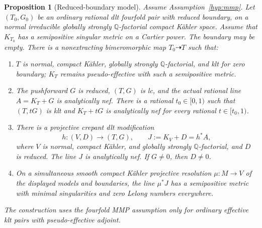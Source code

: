 \documentclass[11pt,letterpaper]{article}
\newtheorem{proposition}[theorem]{Proposition}
\theoremstyle{definition}
\theoremstyle{remark}
\begin{document}
\begin{proposition}[Reduced-boundary model]
\label{bir:reduced-model}
Assume Assumption~\ref{hyp:mmp}.  Let $(T_0,G_0)$ be an ordinary
rational dlt fourfold pair with reduced boundary, on a normal
irreducible globally strongly $\mathbb{Q}$-factorial compact K\"ahler space.
Assume that $K_{T_0}$ has a semipositive singular metric on a Cartier
power.  The boundary may be empty.  There is a nonextracting
bimeromorphic map $T_0\dashrightarrow T$ such that:
\begin{enumerate}[label=\textup{(\roman*)}]
\item $T$ is normal, compact K\"ahler, globally strongly
$\mathbb{Q}$-factorial, and klt for zero boundary; $K_T$ remains
pseudo-effective with such a semipositive metric.
\item The pushforward $G$ is reduced, $(T,G)$ is lc, and the
actual rational line $A=K_T+G$ is analytically nef.  There is a
rational $t_0\in[0,1)$ such that $(T,tG)$ is klt and
$K_T+tG$ is analytically nef for every rational
$t\in[t_0,1)$.
\item There is a projective crepant dlt modification
\begin{equation}
 h:(V,D)\longrightarrow(T,G),\qquad
 J:=K_V+D=h^*A,
 \label{bir:reduced-adjoint}
\end{equation}
where $V$ is normal, compact K\"ahler, and globally strongly
$\mathbb{Q}$-factorial, and $D$ is reduced.  The line $J$ is analytically
nef.  If $G\ne0$, then $D\ne0$.
\item On a simultaneous smooth compact K\"ahler projective
resolution $\mu:M\to V$ of the displayed models and boundaries,
the line $\mu^*J$ has a semipositive metric with minimal
singularities and zero Lelong numbers everywhere.
\end{enumerate}
The construction uses the fourfold MMP assumption only for ordinary
effective klt pairs with pseudo-effective adjoint.
\end{proposition}
\end{document}
